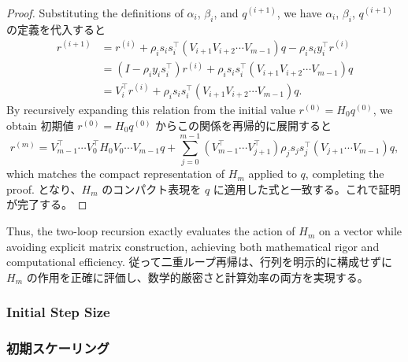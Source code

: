 \documentclass[0_main]{subfiles}
\begin{document}
\begin{proof}
    \ifEn
        Substituting the definitions of $\alpha_i$, $\beta_i$, and $q^{(i+1)}$, we have
    \else
        $\alpha_i$, $\beta_i$, $q^{(i+1)}$ の定義を代入すると
    \fi
    \begin{align*}
        r^{(i+1)}
         & =
        r^{(i)} + \rho_i s_i s_i^\top \left(V_{i+1} V_{i+2} \cdots V_{m-1}\right) q - \rho_i s_i y_i^\top r^{(i)}            \\
         & = \left(I- \rho_i y_i s_i^\top\right) r^{(i)} + \rho_i s_i s_i^\top \left(V_{i+1} V_{i+2} \cdots V_{m-1}\right) q \\
         & =
        V_i^\top r^{(i)}
        +
        \rho_i s_i s_i^\top
        \left(V_{i+1} V_{i+2} \cdots V_{m-1}\right) q.
    \end{align*}
    \ifEn
        By recursively expanding this relation from the initial value $r^{(0)} = H_0 q^{(0)}$, we obtain
    \else
        初期値 $r^{(0)} = H_0 q^{(0)}$ からこの関係を再帰的に展開すると
    \fi
    \begin{equation*}
        r^{(m)}
        =
        V_{m-1}^\top \cdots V_0^\top H_0 V_0 \cdots V_{m-1} q
        +
        \sum_{j=0}^{m-1}
        (V_{m-1}^\top \cdots V_{j+1}^\top)
        \rho_j s_j s_j^\top
        (V_{j+1} \cdots V_{m-1}) q,
    \end{equation*}
    \ifEn
        which matches the compact representation of $H_m$ applied to $q$, completing the proof.
    \else
        となり、$H_m$ のコンパクト表現を $q$ に適用した式と一致する。これで証明が完了する。
    \fi
    \myQED
\end{proof}

\ifEn
    Thus, the two-loop recursion exactly evaluates the action of $H_m$ on a vector while avoiding explicit matrix construction, achieving both mathematical rigor and computational efficiency.
\else
    従って二重ループ再帰は、行列を明示的に構成せずに $H_m$ の作用を正確に評価し、数学的厳密さと計算効率の両方を実現する。
\fi

\ifEn
    \subsubsection{Initial Step Size}
\else
    \subsubsection{初期スケーリング}
\fi
\end{document}
